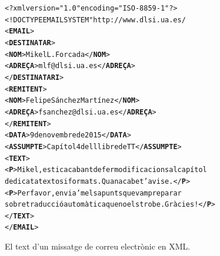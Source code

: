 \begin{figure}
\begin{center}
\begin{alltt}
<?xml version="1.0" encoding="ISO-8859-1"?>
<!DOCTYPE EMAIL SYSTEM "http://www.dlsi.ua.es/%
<\textbf{EMAIL}>
  <\textbf{DESTINATAR}>
    <\textbf{NOM}>Mikel L. Forcada</\textbf{NOM}>
    <\textbf{ADREÇA}>mlf@dlsi.ua.es</\textbf{ADREÇA}>
  </\textbf{DESTINATARI}>
  <\textbf{REMITENT}>
    <\textbf{NOM}>Felipe Sánchez Martínez</\textbf{NOM}>
    <\textbf{ADREÇA}>fsanchez@dlsi.ua.es</\textbf{ADREÇA}>
  </\textbf{REMITENT}>
  <\textbf{DATA}>9 de novembre de 2015</\textbf{DATA}>
  <\textbf{ASSUMPTE}>Capítol 4 del llibre de TT</\textbf{ASSUMPTE}>
  <\textbf{TEXT}>
    <\textbf{P}>Mikel, estic acabant de fer modificacions al capítol 
    dedicat a textos i formats. Quan acabe t'avise.</\textbf{P}>
    <\textbf{P}>Per favor, envia'm els apunts que vam preparar 
    sobre traducció automàtica que no els trobe. Gràcies!</\textbf{P}>
  </\textbf{TEXT}>
</\textbf{EMAIL}>
\end{alltt}
\end{center}
\caption{El text d'un missatge de correu electrònic en XML.}
\label{fg:faxXML}
\end{figure}

